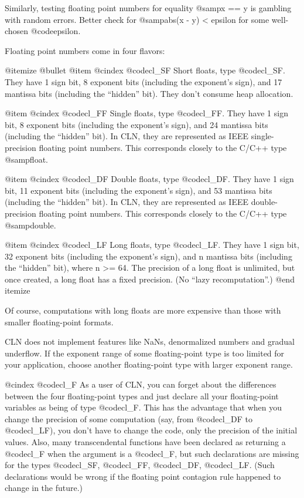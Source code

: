 Similarly, testing floating point numbers for equality @samp{x == y}
is gambling with random errors. Better check for @samp{abs(x - y) < epsilon}
for some well-chosen @code{epsilon}.

Floating point numbers come in four flavors:

@itemize @bullet
@item
@cindex @code{cl_SF}
Short floats, type @code{cl_SF}.
They have 1 sign bit, 8 exponent bits (including the exponent's sign),
and 17 mantissa bits (including the ``hidden'' bit).
They don't consume heap allocation.

@item
@cindex @code{cl_FF}
Single floats, type @code{cl_FF}.
They have 1 sign bit, 8 exponent bits (including the exponent's sign),
and 24 mantissa bits (including the ``hidden'' bit).
In CLN, they are represented as IEEE single-precision floating point numbers.
This corresponds closely to the C/C++ type @samp{float}.

@item
@cindex @code{cl_DF}
Double floats, type @code{cl_DF}.
They have 1 sign bit, 11 exponent bits (including the exponent's sign),
and 53 mantissa bits (including the ``hidden'' bit).
In CLN, they are represented as IEEE double-precision floating point numbers.
This corresponds closely to the C/C++ type @samp{double}.

@item
@cindex @code{cl_LF}
Long floats, type @code{cl_LF}.
They have 1 sign bit, 32 exponent bits (including the exponent's sign),
and n mantissa bits (including the ``hidden'' bit), where n >= 64.
The precision of a long float is unlimited, but once created, a long float
has a fixed precision. (No ``lazy recomputation''.)
@end itemize

Of course, computations with long floats are more expensive than those
with smaller floating-point formats.

CLN does not implement features like NaNs, denormalized numbers and
gradual underflow. If the exponent range of some floating-point type
is too limited for your application, choose another floating-point type
with larger exponent range.

@cindex @code{cl_F}
As a user of CLN, you can forget about the differences between the
four floating-point types and just declare all your floating-point
variables as being of type @code{cl_F}. This has the advantage that
when you change the precision of some computation (say, from @code{cl_DF}
to @code{cl_LF}), you don't have to change the code, only the precision
of the initial values. Also, many transcendental functions have been
declared as returning a @code{cl_F} when the argument is a @code{cl_F},
but such declarations are missing for the types @code{cl_SF}, @code{cl_FF},
@code{cl_DF}, @code{cl_LF}. (Such declarations would be wrong if
the floating point contagion rule happened to change in the future.)


